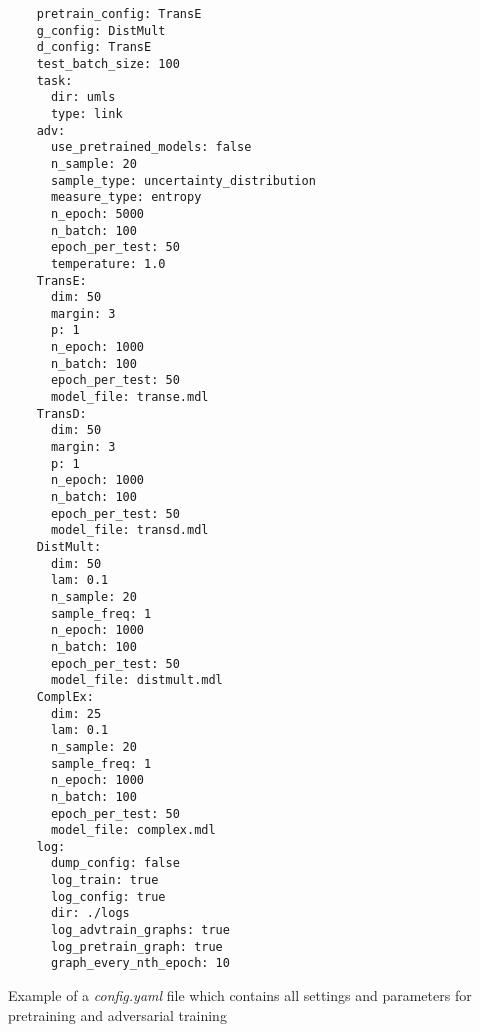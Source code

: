 \begin{longlisting}
  \begin{verbatim}
    pretrain_config: TransE
    g_config: DistMult
    d_config: TransE 
    test_batch_size: 100 
    task:
      dir: umls 
      type: link
    adv:
      use_pretrained_models: false
      n_sample: 20 
      sample_type: uncertainty_distribution
      measure_type: entropy   
      n_epoch: 5000
      n_batch: 100 
      epoch_per_test: 50
      temperature: 1.0
    TransE:
      dim: 50
      margin: 3
      p: 1
      n_epoch: 1000 
      n_batch: 100 
      epoch_per_test: 50
      model_file: transe.mdl
    TransD:
      dim: 50
      margin: 3
      p: 1
      n_epoch: 1000 
      n_batch: 100
      epoch_per_test: 50
      model_file: transd.mdl
    DistMult:
      dim: 50
      lam: 0.1
      n_sample: 20
      sample_freq: 1
      n_epoch: 1000
      n_batch: 100
      epoch_per_test: 50
      model_file: distmult.mdl
    ComplEx:
      dim: 25
      lam: 0.1
      n_sample: 20
      sample_freq: 1
      n_epoch: 1000 
      n_batch: 100 
      epoch_per_test: 50
      model_file: complex.mdl
    log:
      dump_config: false
      log_train: true
      log_config: true
      dir: ./logs
      log_advtrain_graphs: true
      log_pretrain_graph: true
      graph_every_nth_epoch: 10
\end{verbatim}
  \caption{Example of a \textit{config.yaml} file which contains all settings and parameters for pretraining and adversarial training}
  \label{lst:config_yaml}
\end{longlisting}